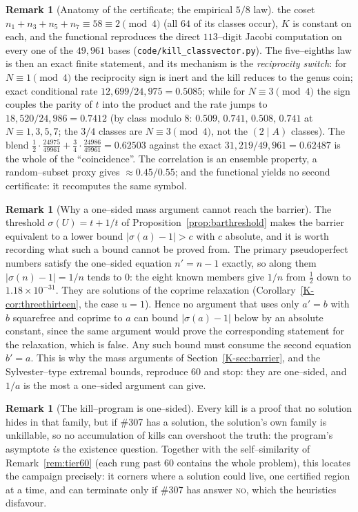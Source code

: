 \documentclass[11pt]{article}
\theoremstyle{definition}
\newtheorem{remark}[theorem]{Remark}
\begin{document}
\begin{remark}[Anatomy of the certificate; the empirical $5/8$ law]
the coset $n_1+n_3+n_5+n_7\equiv58\equiv2\pmod4$ (all $64$ of its classes occur), $K$ is constant
on each, and the functional reproduces the direct $113$--digit Jacobi computation on every one of
the $49{,}961$ bases (\texttt{code/kill\_classvector.py}). The five--eighths law is then an exact
finite statement, and its mechanism is the \emph{reciprocity switch}: for $N\equiv1\pmod4$ the
reciprocity sign is inert and the kill reduces to the genus coin; exact conditional rate
$12{,}699/24{,}975=0.5085$; while for $N\equiv3\pmod4$ the sign couples the parity of $t$ into
the product and the rate jumps to $18{,}520/24{,}986=0.7412$ (by class modulo $8$:
$0.509,\,0.741,\,0.508,\,0.741$ at $N\equiv1,3,5,7$; the $3/4$ classes are $N\equiv3\pmod4$, not
the $(2\mid A)$ classes). The blend $\tfrac12\cdot\tfrac{24975}{49961}+\tfrac34\cdot\tfrac{24986}{49961}
=0.62503$ against the exact $31{,}219/49{,}961=0.62487$ is the whole of the ``coincidence''. The
correlation is an ensemble property, a random--subset proxy gives ${\approx}0.45/0.55$; and
the functional yields no second certificate: it recomputes the same symbol.
\end{remark}

\begin{remark}[Why a one--sided mass argument cannot reach the barrier]\label{rem:twosided}
The threshold $\sigma(U)=t+1/t$ of Proposition~\ref{prop:barthreshold} makes the barrier equivalent to a
lower bound $|\sigma(a)-1|>c$ with $c$ absolute, and it is worth recording what such a bound cannot
be proved from. The primary pseudoperfect numbers satisfy the one--sided equation $n'=n-1$ exactly,
so along them $|\sigma(n)-1|=1/n$ tends to $0$: the eight known members give
$1/n$ from $\tfrac12$ down to $1.18\times10^{-31}$. They are solutions of the coprime relaxation
(Corollary~\ref{K-cor:threethirteen}, the case $u=1$). Hence no argument that uses only $a'=b$ with $b$
squarefree and coprime to $a$ can bound $|\sigma(a)-1|$ below by an absolute constant, since the same
argument would prove the corresponding statement for the relaxation, which is false. Any such bound must
consume the second equation $b'=a$. This is why the mass arguments of Section~\ref{K-sec:barrier}, and the
Sylvester--type extremal bounds, reproduce $60$ and stop: they are one--sided, and $1/a$ is the most a
one--sided argument can give.
\end{remark}

\begin{remark}[The kill--program is one--sided]\label{rem:oneside}
Every kill is a proof that no solution hides in that family, but if \#307 has a solution, the
solution's own family is unkillable, so no accumulation of kills can overshoot the truth: the
program's asymptote \emph{is} the existence question. Together with the self--similarity of
Remark~\ref{rem:tier60} (each rung past $60$ contains the whole problem), this locates the
campaign precisely: it corners where a solution could live, one certified region at a time, and
can terminate only if \#307 has answer \textsc{no}, which the heuristics disfavour.
\end{remark}
\end{document}
